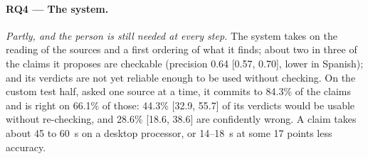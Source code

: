 \paragraph{RQ4 --- The system.} \emph{Partly, and the person is still
needed at every step.} The system takes on the reading of the sources
and a first ordering of what it finds; about two in three of the claims
it proposes are checkable (precision 0.64 [0.57, 0.70], lower in
Spanish); and its verdicts are not yet reliable enough to be used
without checking. On the custom test half, asked one source at a time,
it commits to 84.3\% of the claims and is right on 66.1\% of those:
44.3\% [32.9, 55.7] of its verdicts would be usable without re-checking,
and 28.6\% [18.6, 38.6] are confidently wrong. A claim takes about 45
to 60~s on a desktop processor, or 14--18~s at some 17 points less
accuracy.
